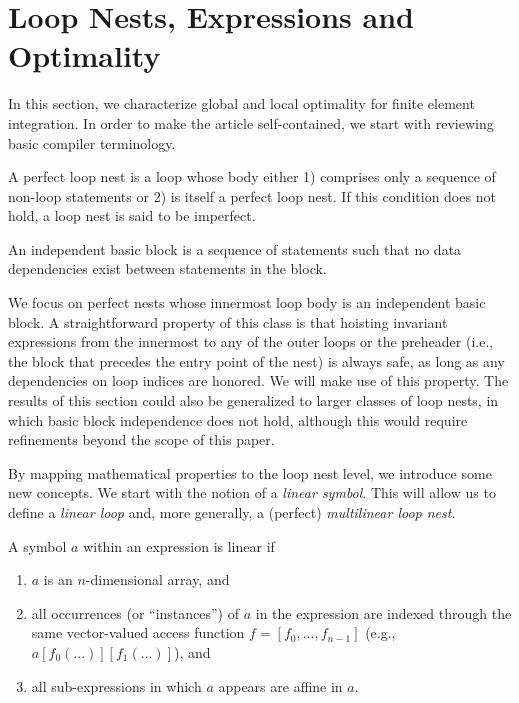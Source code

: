 

\section{Loop Nests, Expressions and Optimality}
\label{sec:lnopt}
In this section, we characterize global and local optimality for finite element integration. In order to make the article self-contained, we start with reviewing basic compiler terminology.

\begin{Def}
A perfect loop nest is a loop whose body either 1) comprises only a sequence
of non-loop statements or 2) is itself a perfect loop nest. If this
condition does not hold, a loop nest is said to be imperfect. 
\end{Def}

\begin{Def}
An independent basic block is a sequence of statements such that no data
dependencies exist between statements in the block.
\end{Def}

We focus on perfect nests whose innermost loop body is an independent basic
block. A straightforward property of this class is that hoisting invariant
expressions from the innermost to any of the outer loops or the preheader
(i.e., the block that precedes the entry point of the nest) is always safe,
as long as any dependencies on loop indices are honored. We will make use of this property. The results of this section could also be generalized to larger classes of loop nests, in which basic block independence does not hold, although this would require refinements beyond the scope of this paper. 

By mapping mathematical properties to the loop nest level, we introduce some new concepts. We start with the notion of a {\em linear symbol}. This will allow us to define a {\em linear loop} and, more generally, a (perfect) {\em multilinear loop nest}.

\begin{Def}
\label{def:linear-symbol}
A symbol $a$ within an expression is linear if
\begin{enumerate}
\item $a$ is an $n$-dimensional array, and
\item all occurrences (or ``instances'') of $a$ in the expression are indexed through the same vector-valued access function $f = [f_0, ..., f_{n-1}]$ (e.g., $a[f_0(...)][f_1(...)]$), and
\item all sub-expressions in which $a$ appears are affine in $a$.
\end{enumerate}
\end{Def}

